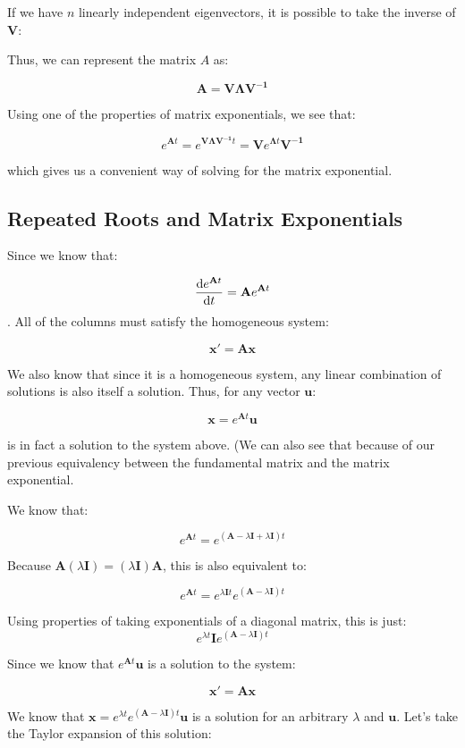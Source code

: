 \documentclass{report}
\begin{document}
If we have $n$ linearly independent eigenvectors, it is possible to take the inverse of $\mathbf{V}$:

Thus, we can represent the matrix $A$ as:

$$\mathbf{A} = \mathbf{V\Lambda V^{-1}}$$

Using one of the properties of matrix exponentials, we see that:

$$e^{\mathbf{A}t} = e^{\mathbf{V\Lambda V^{-1}}t} = \mathbf{V}e^{\mathbf{\Lambda} t}\mathbf{V^{-1}} $$

which gives us a convenient way of solving for the matrix exponential.

\subsection{Repeated Roots and Matrix Exponentials}

Since we know that:

$$\dv{e^{\mathbf{A}t}}{t} = \mathbf{A}e^{\mathbf{A}t}$$. All of the columns must satisfy the homogeneous system:

$$\mathbf{x}' = \mathbf{Ax}$$

We also know that since it is a homogeneous system, any linear combination of solutions is also itself a solution. Thus, for any vector $\mathbf{u}$:

$$\mathbf{x} = e^{\mathbf{A}t}\mathbf{u}$$ 

is in fact a solution to the system above. (We can also see that because of our previous equivalency between the fundamental matrix and the matrix exponential.

We know that:

$$e^{\mathbf{A}t} = e^{(\mathbf{A}-\lambda \mathbf{I} + \lambda\mathbf{I})t}$$

Because $\mathbf{A}(\lambda \mathbf{I}) = (\lambda \mathbf{I})\mathbf{A}$, this is also equivalent to:

$$e^{\mathbf{A}t} = e^{\lambda\mathbf{I}t}e^{(\mathbf{A}-\lambda \mathbf{I} )t}$$

Using properties of taking exponentials of a diagonal matrix, this is just:
$$e^{\lambda t}\mathbf{I}e^{(\mathbf{A}-\lambda \mathbf{I} )t}$$

Since we know that $e^{\mathbf{A}t}\mathbf{u}$ is a solution to the system:

$$\mathbf{x'} = \mathbf{Ax}$$

We know that $\mathbf{x} = e^{\lambda t}e^{(\mathbf{A}-\lambda \mathbf{I} )t}\mathbf{u}$ is a solution
for an arbitrary $\lambda$ and $\mathbf{u}$. Let's take the Taylor expansion of this solution:
\end{document}
